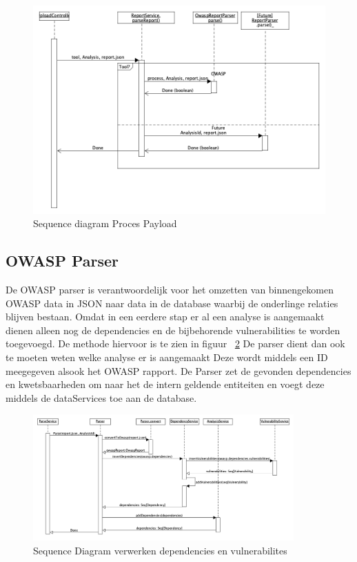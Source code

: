 \begin{figure}[bth]
    \myfloatalign
    \includegraphics[width=14cm]{gfx/umlet/exports/SeqProcessPayload}
    \caption{Sequence diagram Proces Payload}
    \label{fig:ProcesPayload}
\end{figure}

\subsection{OWASP Parser}\label{subsec:owasp-parser}
De OWASP parser is verantwoordelijk voor het omzetten van binnengekomen OWASP data in JSON naar data in de database waarbij de onderlinge relaties blijven bestaan.
Omdat in een eerdere stap er al een analyse is aangemaakt dienen alleen nog de dependencies en de bijbehorende vulnerabilities te worden toegevoegd. De methode hiervoor is te zien in figuur ~\ref{fig:seqReportParse}
De parser dient dan ook te moeten weten welke analyse er is aangemaakt Deze wordt middels een ID meegegeven alsook het OWASP rapport. De Parser zet de gevonden dependencies en kwetsbaarheden om naar het de intern geldende entiteiten en voegt deze middels de dataServices toe aan de database.

\begin{figure}[bth]
    \myfloatalign
    \includegraphics[width=10cm]{gfx/umlet/exports/Seq-ParseReport}
    \caption{Sequence Diagram verwerken dependencies en vulnerabilites}
    \label{fig:seqReportParse}
\end{figure}


